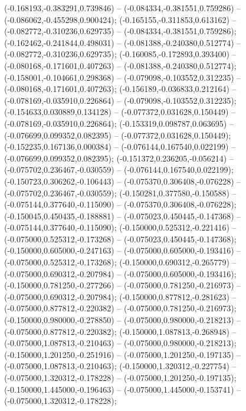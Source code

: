  (-0.168193,-0.383291,0.739846) -- (-0.084334,-0.381551,0.759286) -- (-0.086062,-0.455298,0.900424);
 (-0.165155,-0.311853,0.613162) -- (-0.082772,-0.310236,0.629735) -- (-0.084334,-0.381551,0.759286);
 (-0.162462,-0.241844,0.498031) -- (-0.081388,-0.240380,0.512774) -- (-0.082772,-0.310236,0.629735);
 (-0.160085,-0.172893,0.393400) -- (-0.080168,-0.171601,0.407263) -- (-0.081388,-0.240380,0.512774);
 (-0.158001,-0.104661,0.298368) -- (-0.079098,-0.103552,0.312235) -- (-0.080168,-0.171601,0.407263);
 (-0.156189,-0.036833,0.212164) -- (-0.078169,-0.035910,0.226864) -- (-0.079098,-0.103552,0.312235);
 (-0.154633,0.030889,0.134128) -- (-0.077372,0.031628,0.150449) -- (-0.078169,-0.035910,0.226864);
 (-0.153319,0.098787,0.063695) -- (-0.076699,0.099352,0.082395) -- (-0.077372,0.031628,0.150449);
 (-0.152235,0.167136,0.000384) -- (-0.076144,0.167540,0.022199) -- (-0.076699,0.099352,0.082395);
 (-0.151372,0.236205,-0.056214) -- (-0.075702,0.236467,-0.030559) -- (-0.076144,0.167540,0.022199);
 (-0.150723,0.306262,-0.106443) -- (-0.075370,0.306408,-0.076228) -- (-0.075702,0.236467,-0.030559);
 (-0.150281,0.377580,-0.150588) -- (-0.075144,0.377640,-0.115090) -- (-0.075370,0.306408,-0.076228);
 (-0.150045,0.450435,-0.188881) -- (-0.075023,0.450445,-0.147368) -- (-0.075144,0.377640,-0.115090);
 (-0.150000,0.525312,-0.221416) -- (-0.075000,0.525312,-0.173268) -- (-0.075023,0.450445,-0.147368);
 (-0.150000,0.605000,-0.247163) -- (-0.075000,0.605000,-0.193416) -- (-0.075000,0.525312,-0.173268);
 (-0.150000,0.690312,-0.265779) -- (-0.075000,0.690312,-0.207984) -- (-0.075000,0.605000,-0.193416);
 (-0.150000,0.781250,-0.277266) -- (-0.075000,0.781250,-0.216973) -- (-0.075000,0.690312,-0.207984);
 (-0.150000,0.877812,-0.281623) -- (-0.075000,0.877812,-0.220382) -- (-0.075000,0.781250,-0.216973);
 (-0.150000,0.980000,-0.278850) -- (-0.075000,0.980000,-0.218213) -- (-0.075000,0.877812,-0.220382);
 (-0.150000,1.087813,-0.268948) -- (-0.075000,1.087813,-0.210463) -- (-0.075000,0.980000,-0.218213);
 (-0.150000,1.201250,-0.251916) -- (-0.075000,1.201250,-0.197135) -- (-0.075000,1.087813,-0.210463);
 (-0.150000,1.320312,-0.227754) -- (-0.075000,1.320312,-0.178228) -- (-0.075000,1.201250,-0.197135);
 (-0.150000,1.445000,-0.196463) -- (-0.075000,1.445000,-0.153741) -- (-0.075000,1.320312,-0.178228);
